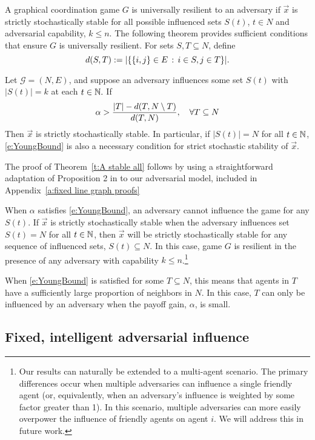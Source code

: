 A graphical coordination game $G$ is universally resilient to an adversary if $\vec{x}$ is strictly stochastically stable for all possible influenced sets $S(t)$, $t\in N$ and adversarial capability, $k\leq n.$ The following theorem provides sufficient conditions that ensure $G$ is universally resilient. For sets $S,T\subseteq N$, define
$$d(S,T) := |\{\{i,j\}\in E\,:\, i\in S, j\in T\}|.$$

\begin{Theorem}\label{t:A stable all}
Let $\mathcal{G} = (N,E)$, and suppose an adversary influences some set $S(t)$ with $|S(t)| = k$ at each $t\in\mathbb{N}.$ If
\begin{equation}\label{e:YoungBound}
\alpha > {|T| - d(T,N\setminus T)\over d(T,N)},\quad\forall T\subseteq N
\end{equation}
Then $\vec{x}$ is strictly stochastically stable. In particular, if $|S(t)| = N$ for all $t\in \mathbb{N}$, \eqref{e:YoungBound} is also a necessary condition for strict stochastic stability of $\vec{x}$. 
\end{Theorem}

\smallskip

The proof of Theorem~\ref{t:A stable all} follows by using a straightforward adaptation of Proposition 2 in \cite{Young2011} to our adversarial model, included in Appendix~\ref{a:fixed line graph proofs}

When $\alpha$ satisfies \eqref{e:YoungBound}, an adversary cannot influence the game for any $S(t).$ If $\vec{x}$ is strictly stochastically stable when the adversary influences set $S(t)=N$ for all $t\in\mathbb{N}$, then $\vec{x}$ will be strictly stochastically stable for any sequence of influenced sets, $S(t)\subseteq N.$ In this case, game $G$ is resilient in the presence of any adversary with capability $k\leq n$.\footnote{Our results can naturally be extended to a multi-agent scenario. The primary differences occur when multiple adversaries can influence a single friendly agent (or, equivalently, when an adversary's influence is weighted by some factor greater than 1). In this scenario, multiple adversaries can more easily overpower the influence of friendly agents on agent $i$. We will address this in future work.}

When \eqref{e:YoungBound} is satisfied for some $T\subseteq N$, this means that agents in $T$ have a sufficiently large proportion of neighbors in $N$. In this case, $T$ can only be influenced by an adversary when the payoff gain, $\alpha$, is small.

\subsection{Fixed, intelligent adversarial influence}

